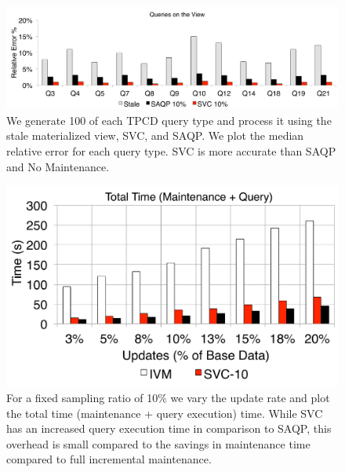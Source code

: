 \begin{figure}[t]
\centering
\includegraphics[scale=0.16]{exp/msj_3.pdf}
 \caption{We generate 100 of each TPCD query type and process it using the stale materialized view, SVC, and SAQP. We plot the median relative error for each query type. SVC is more accurate than SAQP and No Maintenance. \label{exp-1-acc}}
\end{figure}

\begin{figure}[t]
\centering
 \includegraphics[scale=0.16]{exp/msj_4.pdf}
  \caption{For a fixed sampling ratio of 10\% we vary the update rate and plot the total time (maintenance + query execution) time. While SVC has an increased query execution time in comparison to SAQP, this overhead is small compared to the savings in maintenance time compared to full incremental maintenance.  \label{exp-1-total}}
\end{figure}

